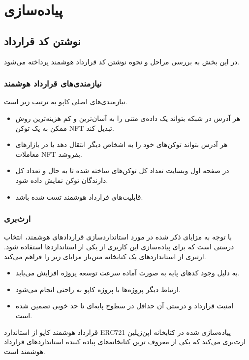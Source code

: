 \chapter{پیاده‌سازی}

\section{نوشتن کد قرارداد}
در این بخش به بررسی مراحل و نحوه نوشتن کد قرارداد هوشمند پرداخته می‌شود.

\subsection{نیازمندی‌های قرارداد هوشمند}
نیازمندی‌های اصلی کاپو به ترتیب زیر است.
\begin{itemize}
  \item
هر آدرس در شبکه بتواند یک داده‌ی متنی را به آسان‌ترین و کم هزینه‌ترین روش ممکن به یک توکن NFT تبدیل کند.
  \item
هر آدرس بتواند توکن‌های خود را به اشخاص دیگر انتقال دهد یا در بازارهای معاملات NFT بفروشد.
  \item
در صفحه اول وبسایت تعداد کل توکن‌های ساخته شده تا به حال و تعداد کل دارندگان توکن نمایش داده شود.
  \item
قابلیت‌های قرارداد هوشمند تست شده باشد.
\end{itemize}

\subsection{ارث‌بری}
با توجه به مزایای ذکر شده در مورد استانداردسازی قراردادهای هوشمند، انتخاب درستی است که برای پیاده‌سازی این کاربری از یکی از استانداردها استفاده شود. ارثبری از استانداردهای یک کتابخانه متن‌باز مزایای زیر را فراهم می‌کند.
\begin{itemize}
  \item
به دلیل وجود کدهای پایه به صورت آماده سرعت توسعه پروژه افزایش می‌یابد.
  \item
ارتباط دیگر پروژه‌ها با پروژه کاپو به راحتی انجام می‌شود.
  \item
امنیت قرارداد و درستی آن حداقل در سطوح پایه‌ای تا حد خوبی تضمین شده است.
\end{itemize}

قرارداد هوشمند کاپو از استاندارد ERC721 پیاده‌سازی شده در کتابخانه اپن‌زپلین
ارث‌بری می‌کند که یکی از معروف ترین کتابخانه‌های پیاده کننده استانداردهای قرارداد هوشمند است.

